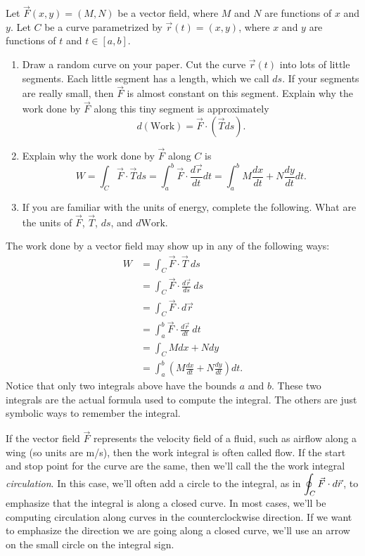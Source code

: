 \begin{problem}[Work]
%
 Let $\vec F(x,y)=(M,N)$ be a vector field, where $M$ and $N$ are functions of $x$ and $y$.   Let $C$ be a curve parametrized by $\vec r(t)=(x,y)$, where $x$ and $y$ are functions of $t$ and $t\in[a,b]$. 
\begin{enumerate}
 \item Draw a random curve on your paper.  Cut the curve $\vec r(t)$ into lots of little segments. Each little segment has a length, which we call $ds$. If your segments are really small, then $\vec F$ is almost constant on this segment.  Explain why the work done by $\vec F$ along this tiny segment is approximately 
$$d(\text{Work}) = \vec F\cdot (\vec T ds).$$
 \item Explain why the work done by $\vec F$ along $C$ is 
$$
W=\int_C \vec F\cdot \vec T ds 
= \int_a^b\vec F\cdot \frac{d\vec r}{dt}dt 
= \int_a^b M\frac{dx}{dt}+N\frac{dy}{dt} dt.
$$
 \item If you are familiar with the units of energy, complete the following. What are the units of $\vec F$,  $\vec T$, $ds$, and $d\text{Work}$.
\end{enumerate}
\end{problem}



The work done by a vector field may show up in any of the following ways: 
\begin{align*}
W
&=\int_C \vec F\cdot \vec T \ ds\\
&=\int_C \vec F\cdot \frac{d\vec r}{ds}\ ds \\
&= \int_C\vec F\cdot d\vec r \\
&=\int_a^b \vec F\cdot \frac{d\vec r}{dt}\ dt \\
&= \int_C Mdx+Ndy \\
&= \int_a^b \left( M\frac{dx}{dt}+N\frac{dy}{dt}\right) dt. 
\end{align*}
Notice that only two integrals above have the bounds $a$ and $b$.  These two integrals are the actual formula used to compute the integral. The others are just symbolic ways to remember the integral.

\begin{definition}
If the vector field $\vec F$ represents the velocity field of a fluid, such as airflow along a wing (so units are m/s), then the work integral is often called flow.  If the start and stop point for the curve are the same, then we'll call the the work integral {\it circulation}. In this case, we'll often add a circle to the integral, as in $\displaystyle\oint_C \vec F\cdot d\vec r$, to emphasize that the integral is along a closed curve.  In most cases, we'll be computing circulation along curves in the counterclockwise direction.  If we want to emphasize the direction we are going along a closed curve, we'll use an arrow on the small circle on the integral sign.
\end{definition}

